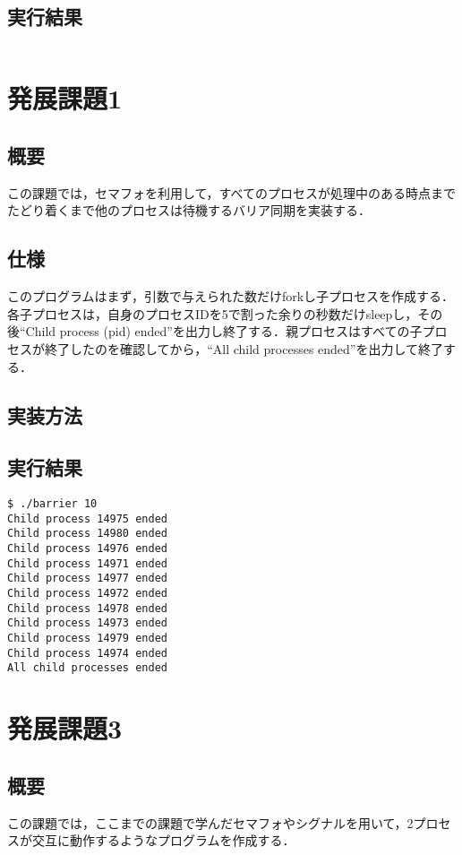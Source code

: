 \documentclass[a4j,10pt,titlepage]{jsarticle}
\begin{document}
\subsection{実行結果}
\begin{verbatim}

\end{verbatim}

\section{発展課題1}
\subsection{概要}
この課題では，セマフォを利用して，すべてのプロセスが処理中のある時点までたどり着くまで他のプロセスは待機するバリア同期を実装する．

\subsection{仕様}
このプログラムはまず，引数で与えられた数だけforkし子プロセスを作成する．各子プロセスは，自身のプロセスIDを5で割った余りの秒数だけsleepし，その後``Child process (pid) ended''を出力し終了する．親プロセスはすべての子プロセスが終了したのを確認してから，``All child processes ended''を出力して終了する．

\subsection{実装方法}


\subsection{実行結果}
\begin{verbatim}
$ ./barrier 10
Child process 14975 ended
Child process 14980 ended
Child process 14976 ended
Child process 14971 ended
Child process 14977 ended
Child process 14972 ended
Child process 14978 ended
Child process 14973 ended
Child process 14979 ended
Child process 14974 ended
All child processes ended
\end{verbatim}
\section{発展課題3}
\subsection{概要}
この課題では，ここまでの課題で学んだセマフォやシグナルを用いて，2プロセスが交互に動作するようなプログラムを作成する．
\end{document}
